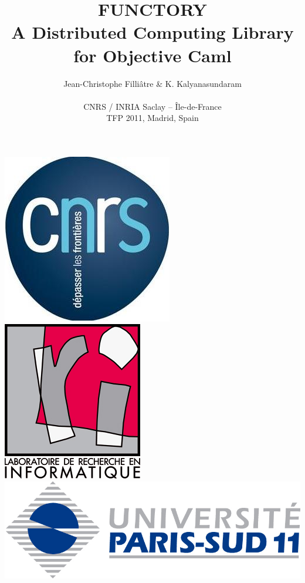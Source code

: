 \documentclass[xcolor=dvipsnames]{beamer}
\begin{document}

\title{FUNCTORY \\ A Distributed Computing Library \\ for Objective Caml}

\author[Kalyan]{Jean-Christophe Filli\^{a}tre \& K. Kalyanasundaram\\
  \- \\ 
  CNRS / INRIA Saclay -- \^{I}le-de-France
\\
\vspace{0.5cm}
TFP 2011, Madrid, Spain
}


\bigskip
\date {}


\bigskip
\begin{frame}
  \titlepage
  \begin{center}
    \includegraphics[scale=0.11]{cnrs-logo2.jpg}
    \hspace{4mm}
    \includegraphics[scale=0.09]{lrilogo.jpg}
    \hspace{4mm}
    \includegraphics[scale=0.09]{upsudlogo.jpg}

\end{center}
\end{frame}
\end{document}
